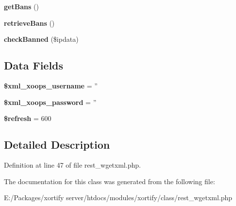 \begin{DoxyCompactItemize}
\item 
\hypertarget{class_r_e_s_t___w_g_e_t_x_m_l_xortify_exchange_aea26db2906896833d32445a698fc4cdc}{{\bfseries get\-Bans} ()}\label{class_r_e_s_t___w_g_e_t_x_m_l_xortify_exchange_aea26db2906896833d32445a698fc4cdc}

\item 
\hypertarget{class_r_e_s_t___w_g_e_t_x_m_l_xortify_exchange_a4af29af927aae9aada97ef0c2cd08fa1}{{\bfseries retrieve\-Bans} ()}\label{class_r_e_s_t___w_g_e_t_x_m_l_xortify_exchange_a4af29af927aae9aada97ef0c2cd08fa1}

\item 
\hypertarget{class_r_e_s_t___w_g_e_t_x_m_l_xortify_exchange_ae41df0f26620b727f7f63342648f6474}{{\bfseries check\-Banned} (\$ipdata)}\label{class_r_e_s_t___w_g_e_t_x_m_l_xortify_exchange_ae41df0f26620b727f7f63342648f6474}

\end{DoxyCompactItemize}
\subsection*{Data Fields}
\begin{DoxyCompactItemize}
\item 
\hypertarget{class_r_e_s_t___w_g_e_t_x_m_l_xortify_exchange_a725df0dd6b578e15522ed15945e5901c}{{\bfseries \$xml\-\_\-xoops\-\_\-username} = ''}\label{class_r_e_s_t___w_g_e_t_x_m_l_xortify_exchange_a725df0dd6b578e15522ed15945e5901c}

\item 
\hypertarget{class_r_e_s_t___w_g_e_t_x_m_l_xortify_exchange_a8ec2889165c837354fded1cedbd42157}{{\bfseries \$xml\-\_\-xoops\-\_\-password} = ''}\label{class_r_e_s_t___w_g_e_t_x_m_l_xortify_exchange_a8ec2889165c837354fded1cedbd42157}

\item 
\hypertarget{class_r_e_s_t___w_g_e_t_x_m_l_xortify_exchange_a8527f826b6959aaa92b0e51ee427ba1a}{{\bfseries \$refresh} = 600}\label{class_r_e_s_t___w_g_e_t_x_m_l_xortify_exchange_a8527f826b6959aaa92b0e51ee427ba1a}

\end{DoxyCompactItemize}


\subsection{Detailed Description}


Definition at line 47 of file rest\-\_\-wgetxml.\-php.



The documentation for this class was generated from the following file\-:\begin{DoxyCompactItemize}
\item 
E\-:/\-Packages/xortify server/htdocs/modules/xortify/class/rest\-\_\-wgetxml.\-php\end{DoxyCompactItemize}
